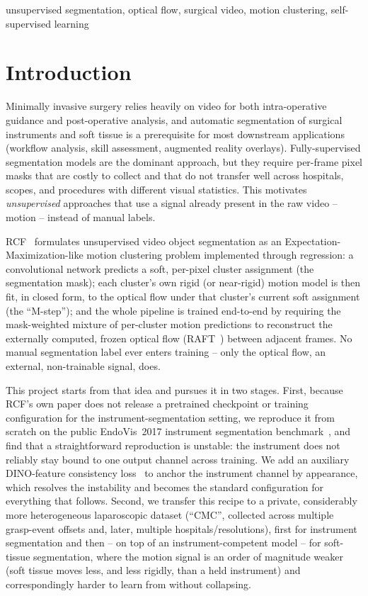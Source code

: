 \documentclass[conference]{IEEEtran}
\begin{document}
\begin{IEEEkeywords}
unsupervised segmentation, optical flow, surgical video, motion clustering, self-supervised learning
\end{IEEEkeywords}

\section{Introduction}

Minimally invasive surgery relies heavily on video for both intra-operative
guidance and post-operative analysis, and automatic segmentation of
surgical instruments and soft tissue is a prerequisite for most
downstream applications (workflow analysis, skill assessment, augmented
reality overlays). Fully-supervised segmentation models are the dominant
approach, but they require per-frame pixel masks that are costly to
collect and that do not transfer well across hospitals, scopes, and
procedures with different visual statistics. This motivates
\emph{unsupervised} approaches that use a signal already present in the
raw video -- motion -- instead of manual labels.

RCF~\cite{rcf_cvpr2023} formulates unsupervised video object segmentation
as an Expectation-Maximization-like motion clustering problem implemented
through regression: a convolutional network predicts a soft, per-pixel
cluster assignment (the segmentation mask); each cluster's own rigid (or
near-rigid) motion model is then fit, in closed form, to the optical flow
under that cluster's current soft assignment (the ``M-step''); and the
whole pipeline is trained end-to-end by requiring the mask-weighted
mixture of per-cluster motion predictions to reconstruct the externally
computed, frozen optical flow (RAFT~\cite{raft_eccv2020}) between adjacent
frames. No manual segmentation label ever enters training -- only the
optical flow, an external, non-trainable signal, does.

This project starts from that idea and pursues it in two stages. First,
because RCF's own paper does not release a pretrained checkpoint or
training configuration for the instrument-segmentation setting, we
reproduce it from scratch on the public EndoVis~2017 instrument
segmentation benchmark~\cite{endovis2017}, and find that a
straightforward reproduction is unstable: the instrument does not
reliably stay bound to one output channel across training. We add an
auxiliary DINO-feature consistency loss~\cite{dino_iccv2021} to anchor the
instrument channel by appearance, which resolves the instability and
becomes the standard configuration for everything that follows. Second,
we transfer this recipe to a private, considerably more heterogeneous
laparoscopic dataset (``CMC'', collected across multiple grasp-event
offsets and, later, multiple hospitals/resolutions), first for instrument
segmentation and then -- on top of an instrument-competent model -- for
soft-tissue segmentation, where the motion signal is an order of
magnitude weaker (soft tissue moves less, and less rigidly, than a
held instrument) and correspondingly harder to learn from without
collapsing.
\end{document}
